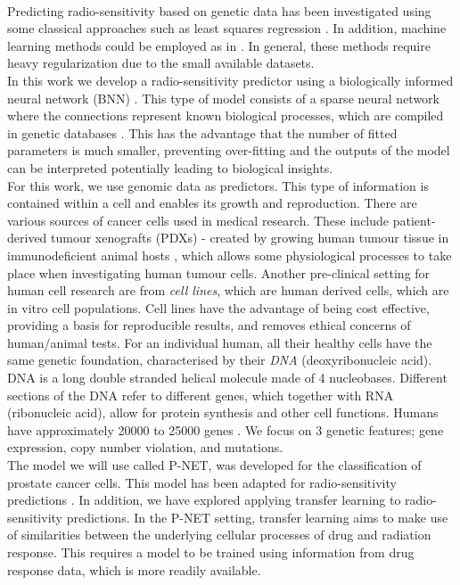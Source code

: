 \documentclass[NOTE, disdraft=true, UKenglish]{\DISCDTLATEXPATH UCLCDTDISdoc}
\begin{document}
\\ \indent 
Predicting radio-sensitivity based on genetic data has been investigated using some classical approaches such as least squares regression \cite{SCOTT2017202}. In addition, machine learning methods could be employed as in \cite{speers2015development}. In general, these methods require heavy regularization due to the small available datasets.
\\ \indent  In this work we develop a radio-sensitivity predictor using a biologically informed neural network (BNN) \cite{review,review_2}. This type of model consists of a sparse neural network where the connections represent known biological processes, which are compiled in genetic databases \cite{reactome,go_1,go_2}. This has the advantage that the number of fitted parameters is much smaller, preventing over-fitting and the outputs of the model can be interpreted potentially leading to biological insights.
\\ \indent 
For this work, we use genomic data as predictors. This type of information is contained within a cell and enables its growth and reproduction. There are various sources of cancer cells used in medical research. These include patient-derived tumour xenografts (PDXs) - created by growing human tumour tissue in immunodeficient animal hosts \cite{NCBI}, which allows some physiological processes to take place when investigating human tumour cells. Another pre-clinical setting for human cell research are from \textit{cell lines}, which are human derived cells, which are in vitro cell populations. Cell lines have the advantage of being cost effective, providing a basis for reproducible results, and removes ethical concerns of human/animal tests. For an individual human, all their healthy cells have the same genetic foundation, characterised by their \textit{DNA} (deoxyribonucleic acid). DNA is a long double stranded helical molecule made of 4 nucleobases. Different sections of the DNA refer to different genes, which together with RNA (ribonucleic acid), allow for protein synthesis and other cell functions. Humans have approximately 20000 to 25000 genes \cite{Cleveland}. We focus on 3 genetic features; gene expression, copy number violation, and mutations. 
\\ \indent 
The model we will use called P-NET\cite{elmarakeby_biologically_2021}, was developed for the classification of prostate cancer cells. This model has been adapted for radio-sensitivity predictions \cite{cosmin_thesis}. In addition, we have explored applying transfer learning \cite{transfer} to radio-sensitivity predictions. In the P-NET setting, transfer learning aims to make use of similarities between the underlying cellular processes of drug and radiation response. This requires a model to be trained using information from drug response data, which is more readily available.
\end{document}
